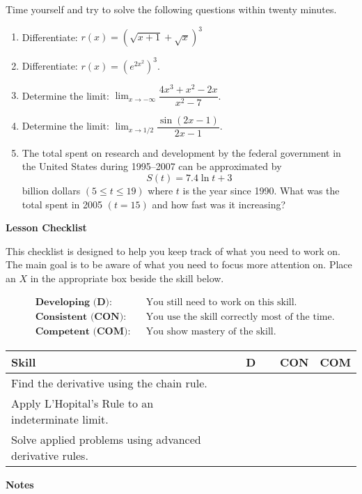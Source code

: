 \documentclass[10pt]{book}
\theoremstyle{definition}
\theoremstyle{remark}
\begin{document}
\begin{large}
\noindent
Time yourself and try to solve the following questions within twenty minutes. 
\begin{enumerate}
\item Differentiate: $r\left(x\right) = \left(\sqrt{x+1} + \sqrt{x} \right)^3$\vfil
\item Differentiate: $r\left(x\right) = \left(e^{2x^2}\right)^3$.\vfil
\item Determine the limit: $\displaystyle\lim_{x \rightarrow -\infty} \dfrac{4x^3 +x^2 -2x}{x^2 - 7}$.\vfil
\item Determine the limit: $\displaystyle\lim_{x \rightarrow 1/2} \dfrac{\sin(2x-1)}{2x-1}$.\vfil
\item The total spent on research and development by the federal government in the United States during 1995–2007 can be approximated by \[S(t) = 7.4 \ln t + 3\] billion dollars $(5 \leq t \leq 19)$ where $t$ is the year since 1990. What was the total spent in 2005 $(t = 15)$ and how fast was it increasing?\vfil
\end{enumerate}

\noindent
\textbf{Lesson Checklist}
\bigskip

\noindent
This checklist is designed to help you keep track of what you need to work on. The main goal is to be aware of what you need to focus more attention on. Place an $X$ in the appropriate box beside the skill below. 
\bigskip

\noindent
\begin{align*}
&\textbf{Developing (D):} &&\textrm{You still need to work on this skill.}\\
&\textbf{Consistent (CON):} &&\textrm{You use the skill correctly most of the time.}\\
&\textbf{Competent (COM):} &&\textrm{You show mastery of the skill.} 
\end{align*}
\vfil

\begin{center}
\begin{tabular}{|l|l|l|l|}
\hline
\textbf{Skill} & \textbf{~~D~~} & \textbf{CON} & \textbf{COM} \\
\hline
Find the derivative using the chain rule.&&&\\
\hline
Apply L'Hopital's Rule to an indeterminate limit.&&&\\
\hline
Solve applied problems using advanced derivative rules.&&&\\
\hline
\end{tabular}
\end{center}
 \vfil

\noindent
\textbf{Notes}
\end{large} \vfil
\newpage
\end{document}
